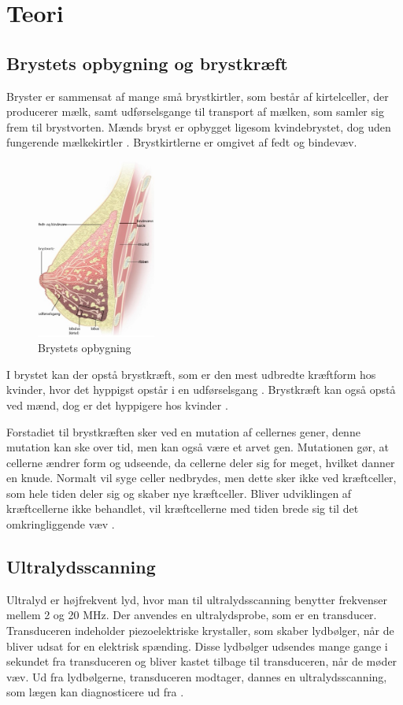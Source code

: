 \chapter{Teori}\label{Teori}

\section{Brystets opbygning og brystkræft}
Bryster er sammensat af mange små brystkirtler, som består af kirtelceller, der producerer mælk, samt udførselsgange til transport af mælken, som samler sig frem til brystvorten. Mænds bryst er opbygget ligesom kvindebrystet, dog uden fungerende mælkekirtler \cite{Mand}. Brystkirtlerne er omgivet af fedt og bindevæv. \citep{Bryst} 

\begin{figure}[H]
    \centering
    \includegraphics[width=0.35\textwidth]{figurer/r/bryst}
    \caption{Brystets opbygning \citep{Bryst}}
    \label{Brystet}
\end{figure}

I brystet kan der opstå brystkræft, som er den mest udbredte kræftform hos kvinder, hvor det hyppigst opstår i en udførselsgang \citep{Bryst}. Brystkræft kan også opstå ved mænd, dog er det hyppigere hos kvinder \cite{Mand}.

Forstadiet til brystkræften sker ved en mutation af cellernes gener, denne mutation kan ske over tid, men kan også være et arvet gen. Mutationen gør, at cellerne ændrer form og udseende, da cellerne deler sig for meget, hvilket danner en knude. Normalt vil syge celler nedbrydes, men dette sker ikke ved kræftceller, som hele tiden deler sig og skaber nye kræftceller. Bliver udviklingen af kræftcellerne ikke behandlet, vil kræftcellerne med tiden brede sig til det omkringliggende væv \cite{Udvikling}.

\section{Ultralydsscanning}
Ultralyd er højfrekvent lyd, hvor man til ultralydsscanning benytter frekvenser mellem 2 og 20 MHz. Der anvendes en ultralydsprobe, som er en transducer. Transduceren indeholder piezoelektriske krystaller, som skaber lydbølger, når de bliver udsat for en elektrisk spænding. Disse lydbølger udsendes mange gange i sekundet fra transduceren og bliver kastet tilbage til transduceren, når de møder væv. Ud fra lydbølgerne, transduceren modtager, dannes en ultralydsscanning, som lægen kan diagnosticere ud fra \cite{Ultralydsscanning}.

